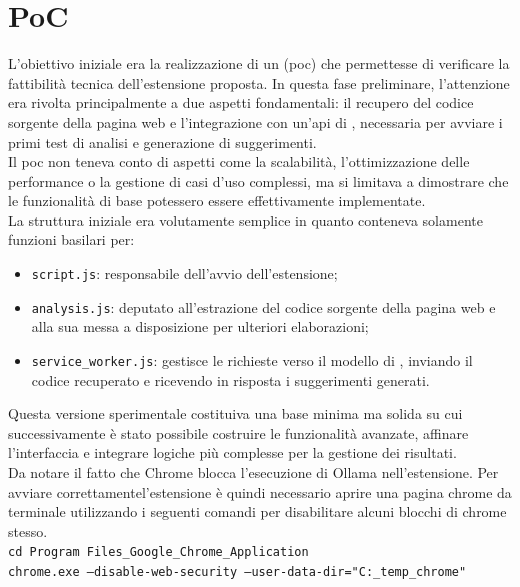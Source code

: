 \section{PoC}
\noindent L’obiettivo iniziale era la realizzazione di un  (\acrshort{poc}) che permettesse di verificare la fattibilità tecnica dell’estensione proposta. In questa fase preliminare, l’attenzione era rivolta principalmente a due aspetti fondamentali: il recupero del codice sorgente della pagina web e l’integrazione con un’\acrshort{api} di , necessaria per avviare i primi test di analisi e generazione di suggerimenti.\\
Il \acrshort{poc} non teneva conto di aspetti come la scalabilità, l’ottimizzazione delle performance o la gestione di casi d’uso complessi, ma si limitava a dimostrare che le funzionalità di base potessero essere effettivamente implementate. 
\\La struttura iniziale era volutamente semplice in quanto conteneva solamente funzioni basilari per:
\begin{itemize}
  \item \texttt{script.js}: responsabile dell’avvio dell’estensione;
  \item \texttt{analysis.js}: deputato all’estrazione del codice sorgente della pagina web e alla sua messa a disposizione per ulteriori elaborazioni;
  \item \texttt{service\_worker.js}: gestisce le richieste verso il modello di , inviando il codice recuperato e ricevendo in risposta i suggerimenti generati.
\end{itemize}

\noindent Questa versione sperimentale costituiva una base minima ma solida su cui successivamente è stato possibile costruire le funzionalità avanzate, affinare l’interfaccia e integrare logiche più complesse per la gestione dei risultati.\\

\noindent Da notare il fatto che Chrome blocca l'esecuzione di Ollama nell'estensione. Per avviare correttamentel'estensione è quindi necessario aprire una pagina chrome da terminale utilizzando i seguenti comandi per disabilitare alcuni blocchi di chrome stesso.\\
\texttt{cd Program Files\_Google\_Chrome\_Application\\
chrome.exe --disable-web-security --user-data-dir="C:\_temp\_chrome"}


